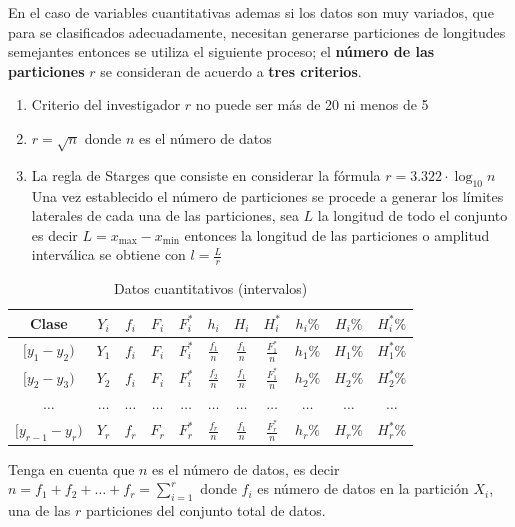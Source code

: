 \documentclass[
  11pt,
]{krantz}
\providecommand{\tightlist}{%
  \setlength{\itemsep}{0pt}\setlength{\parskip}{0pt}}
\theoremstyle{definition}
\theoremstyle{definition}
\theoremstyle{definition}
\theoremstyle{definition}
\theoremstyle{remark}
\begin{document}
En el caso de variables cuantitativas ademas si los datos son muy variados, que para se clasificados adecuadamente, necesitan generarse particiones de longitudes semejantes entonces se utiliza el siguiente proceso; el \textbf{número de las particiones} \(r\) se consideran de acuerdo a \textbf{tres criterios}.

\begin{enumerate}
\def\labelenumi{\arabic{enumi}.}
\tightlist
\item
  Criterio del investigador \(r\) no puede ser más de 20 ni menos de 5
\item
  \(r=\sqrt{n}\) donde \(n\) es el número de datos
\item
  La regla de Starges que consiste en considerar la fórmula \(r=3.322\cdot\log_{10} n\) Una vez establecido el número de particiones se procede a generar los límites laterales de cada una de las particiones, sea \(L\) la longitud de todo el conjunto es decir \(L=x_{\text{max}}-x_{\text{min}}\) entonces la longitud de las particiones o amplitud interválica se obtiene con \(l=\frac{L}{r}\)
\end{enumerate}

\begin{longtable}[t]{ccccccccccc}
\caption{\label{tab:cuantitativaw}Datos cuantitativos (intervalos)}\\
\toprule
Clase & $Y_i$ & $f_i$ & $F_i$ & $F_i^*$ & $h_i$ & $H_i$ & $H_i^*$ & $h_i\%$ & $H_i\%$ & $H_i^*\%$\\
\midrule
$[y_1-y_2)$ & $Y_1$ & $f_i$ & $F_i$ & $F_i^*$ & $\frac{f_1}{n}$ & $\frac{f_1}{n}$ & $\frac{F_1^*}{n}$ & $h_1\%$ & $H_1\%$ & $H_1^*\%$\\
$[y_2-y_3)$ & $Y_2$ & $f_i$ & $F_i$ & $F_i^*$ & $\frac{f_2}{n}$ & $\frac{f_1}{n}$ & $\frac{F_1^*}{n}$ & $h_2\%$ & $H_2\%$ & $H_2^*\%$\\
$\ldots$ & $\ldots$ & $\ldots$ & $\ldots$ & $\ldots$ & $\ldots$ & $\ldots$ & $\ldots$ & $\ldots$ & $\ldots$ & $\ldots$\\
$[y_{r-1}-y_r)$ & $Y_r$ & $f_r$ & $F_r$ & $F_r^*$ & $\frac{f_r}{n}$ & $\frac{f_1}{n}$ & $\frac{F_r^*}{n}$ & $h_r\%$ & $H_r\%$ & $H_r^*\%$\\
\bottomrule
\end{longtable}

Tenga en cuenta que \(n\) es el número de datos, es decir \(n=f_1+f_2+\ldots+f_r=\sum_{i=1}^r\) donde \(f_i\) es número de datos en la partición \(X_i\), una de las \(r\) particiones del conjunto total de datos.
\end{document}
